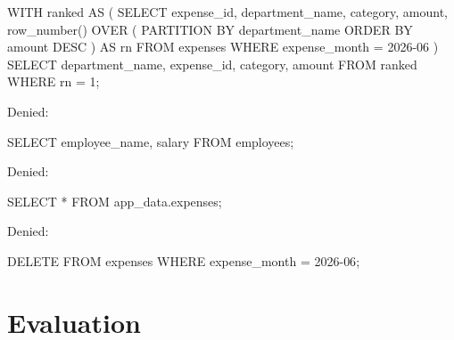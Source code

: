 \documentclass[journal]{IEEEtran}
\newenvironment{Shaded}{}{}
\newcommand{\DecValTok}[1]{\textcolor[rgb]{0.25,0.63,0.44}{#1}}
\newcommand{\FunctionTok}[1]{\textcolor[rgb]{0.02,0.16,0.49}{#1}}
\newcommand{\KeywordTok}[1]{\textcolor[rgb]{0.00,0.44,0.13}{#1}}
\newcommand{\NormalTok}[1]{#1}
\newcommand{\OperatorTok}[1]{\textcolor[rgb]{0.40,0.40,0.40}{#1}}
\newcommand{\StringTok}[1]{\textcolor[rgb]{0.25,0.44,0.63}{#1}}
\begin{document}
\begin{Shaded}
\begin{Highlighting}[]
\KeywordTok{WITH}\NormalTok{ ranked }\KeywordTok{AS}\NormalTok{ (}
  \KeywordTok{SELECT}\NormalTok{ expense\_id, department\_name, }\KeywordTok{category}\NormalTok{, amount,}
         \FunctionTok{row\_number}\NormalTok{() }\KeywordTok{OVER}\NormalTok{ (}
           \KeywordTok{PARTITION} \KeywordTok{BY}\NormalTok{ department\_name }\KeywordTok{ORDER} \KeywordTok{BY}\NormalTok{ amount }\KeywordTok{DESC}
\NormalTok{         ) }\KeywordTok{AS}\NormalTok{ rn}
  \KeywordTok{FROM}\NormalTok{ expenses}
  \KeywordTok{WHERE}\NormalTok{ expense\_month }\OperatorTok{=} \StringTok{\textquotesingle{}2026{-}06\textquotesingle{}}
\NormalTok{)}
\KeywordTok{SELECT}\NormalTok{ department\_name, expense\_id, }\KeywordTok{category}\NormalTok{, amount}
\KeywordTok{FROM}\NormalTok{ ranked}
\KeywordTok{WHERE}\NormalTok{ rn }\OperatorTok{=} \DecValTok{1}\NormalTok{;}
\end{Highlighting}
\end{Shaded}

Denied:

\begin{Shaded}
\begin{Highlighting}[]
\KeywordTok{SELECT}\NormalTok{ employee\_name, salary }\KeywordTok{FROM}\NormalTok{ employees;}
\end{Highlighting}
\end{Shaded}

Denied:

\begin{Shaded}
\begin{Highlighting}[]
\KeywordTok{SELECT} \OperatorTok{*} \KeywordTok{FROM}\NormalTok{ app\_data.expenses;}
\end{Highlighting}
\end{Shaded}

Denied:

\begin{Shaded}
\begin{Highlighting}[]
\KeywordTok{DELETE} \KeywordTok{FROM}\NormalTok{ expenses }\KeywordTok{WHERE}\NormalTok{ expense\_month }\OperatorTok{=} \StringTok{\textquotesingle{}2026{-}06\textquotesingle{}}\NormalTok{;}
\end{Highlighting}
\end{Shaded}


\hypertarget{evaluation}{%
\section{Evaluation}\label{evaluation}}
\end{document}
